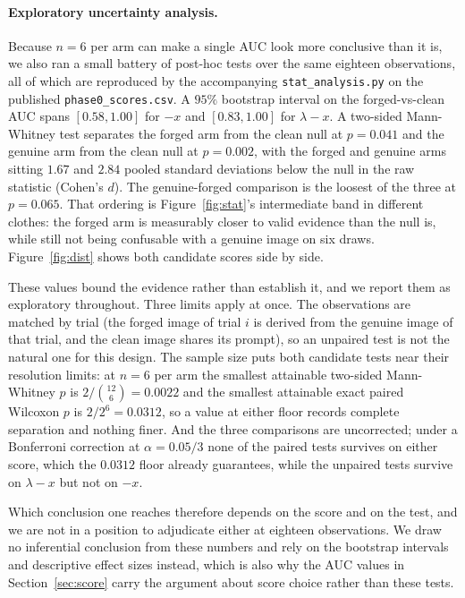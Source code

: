 \documentclass[10pt,twocolumn]{article}
\newcommand{\code}[1]{\texttt{\small #1}}
\newcommand{\xstat}{\ensuremath{x}}
\newcommand{\lam}{\ensuremath{\lambda}}
\begin{document}
\paragraph{Exploratory uncertainty analysis.} Because $n = 6$ per arm can make a
single AUC look more conclusive than it is, we also ran a small battery of post-hoc
tests over the same eighteen observations, all of which are reproduced by the accompanying
\code{stat\_analysis.py} on the published \code{phase0\_scores.csv}. A $95\%$
bootstrap interval on the forged-vs-clean AUC spans
$[0.58, 1.00]$ for $-\xstat$ and $[0.83, 1.00]$ for $\lam - \xstat$. A two-sided
Mann-Whitney test separates the forged arm from the clean null at $p = 0.041$
and the genuine arm from the clean null at $p = 0.002$, with the forged and genuine arms sitting
$1.67$ and $2.84$ pooled standard deviations below the null in the raw statistic
(Cohen's $d$). The genuine-forged comparison is the loosest of the three at
$p = 0.065$. That ordering is Figure~\ref{fig:stat}'s intermediate band in
different clothes: the forged arm is measurably closer to valid evidence than
the null is, while still not being confusable with a genuine image on six draws.
Figure~\ref{fig:dist} shows both candidate scores side by side.

These values bound the evidence rather than establish it, and we report them as
exploratory throughout. Three limits apply at once. The observations are matched by
trial (the forged image of trial $i$ is derived from the genuine image of that
trial, and the clean image shares its prompt), so an unpaired test is not the
natural one for this design. The sample size puts both candidate tests near their
resolution limits: at $n = 6$ per arm the smallest attainable two-sided Mann-Whitney
$p$ is $2/\binom{12}{6} = 0.0022$ and the smallest attainable exact paired Wilcoxon
$p$ is $2/2^{6} = 0.0312$, so a value at either floor records complete separation and
nothing finer. And the three comparisons are uncorrected; under a Bonferroni
correction at $\alpha = 0.05/3$ none of the paired tests survives on either score,
which the $0.0312$ floor already guarantees, while the unpaired tests survive on
$\lam - \xstat$ but not on $-\xstat$.

Which conclusion one reaches therefore depends on the score and on the test, and we
are not in a position to adjudicate either at eighteen observations. We draw no
inferential conclusion from these numbers and rely on the bootstrap intervals and
descriptive effect sizes instead, which is also why the AUC values in
Section~\ref{sec:score} carry the argument about score choice rather than these
tests.
\end{document}
